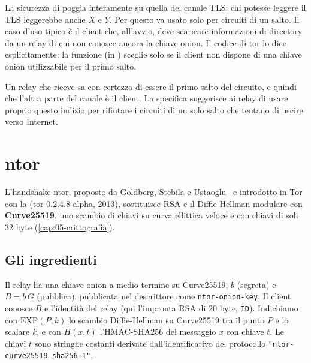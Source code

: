 La sicurezza di  poggia interamente su quella del canale TLS: chi potesse leggere il TLS leggerebbe anche $X$ e $Y$. Per questo va usato solo per circuiti di un salto. Il caso d'uso tipico è il client che, all'avvio, deve scaricare informazioni di directory da un relay di cui non conosce ancora la chiave onion. Il codice di tor lo dice esplicitamente: la funzione  (in ) sceglie  solo se il client non dispone di una chiave onion utilizzabile per il primo salto.

\begin{attenzione}
Un relay che riceve  sa con certezza di essere il primo salto del circuito, e quindi che l'altra parte del canale è il client. La specifica suggerisce ai relay di usare proprio questo indizio per rifiutare i circuiti di un solo salto che tentano di uscire verso Internet.
\end{attenzione}

\section{ntor}\label{sec:ntor}

L'handshake ntor, proposto da Goldberg, Stebila e Ustaoglu~\cite{goldberg2013ntor} e introdotto in Tor con la  (tor 0.2.4.8-alpha, 2013), sostituisce RSA e il Diffie-Hellman modulare con \textbf{Curve25519}, uno scambio di chiavi su curva ellittica veloce e con chiavi di soli 32 byte (\cref{cap:05-crittografia}).

\subsection{Gli ingredienti}

Il relay ha una chiave onion a medio termine su Curve25519, $b$ (segreta) e $B = b\,G$ (pubblica), pubblicata nel descrittore come \texttt{ntor-onion-key}. Il client conosce $B$ e l'identità del relay (qui l'impronta RSA di 20 byte, \texttt{ID}). Indichiamo con $\mathrm{EXP}(P, k)$ lo scambio Diffie-Hellman su Curve25519 tra il punto $P$ e lo scalare $k$, e con $H(x, t)$ l'HMAC-SHA256 del messaggio $x$ con chiave $t$. Le chiavi $t$ sono stringhe costanti derivate dall'identificativo del protocollo \texttt{"ntor-curve25519-sha256-1"}.

